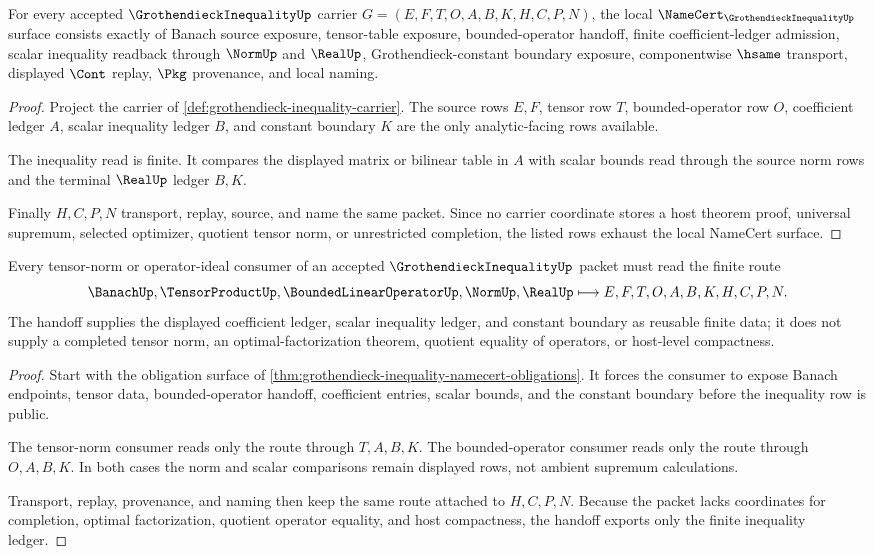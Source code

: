 \begin{theorem}
\label{thm:grothendieck-inequality-namecert-obligations}
For every accepted $\GrothendieckInequalityUp$ carrier $G=(E,F,T,O,A,B,K,H,C,P,N)$, the local $\NameCert_{\GrothendieckInequalityUp}$ surface consists exactly of Banach source exposure, tensor-table exposure, bounded-operator handoff, finite coefficient-ledger admission, scalar inequality readback through $\NormUp$ and $\RealUp$, Grothendieck-constant boundary exposure, componentwise $\hsame$ transport, displayed $\Cont$ replay, $\Pkg$ provenance, and local naming.
\end{theorem}
\begin{proof}
Project the carrier of \autoref{def:grothendieck-inequality-carrier}. The source rows $E,F$, tensor row $T$, bounded-operator row $O$, coefficient ledger $A$, scalar inequality ledger $B$, and constant boundary $K$ are the only analytic-facing rows available.

The inequality read is finite. It compares the displayed matrix or bilinear table in $A$ with scalar bounds read through the source norm rows and the terminal $\RealUp$ ledger $B,K$.

Finally $H,C,P,N$ transport, replay, source, and name the same packet. Since no carrier coordinate stores a host theorem proof, universal supremum, selected optimizer, quotient tensor norm, or unrestricted completion, the listed rows exhaust the local NameCert surface.
\end{proof}

\begin{theorem}
\label{thm:grothendieck-inequality-tensor-norm-handoff}
Every tensor-norm or operator-ideal consumer of an accepted $\GrothendieckInequalityUp$ packet must read the finite route
$$
\BanachUp,\TensorProductUp,\BoundedLinearOperatorUp,\NormUp,\RealUp
\longmapsto
E,F,T,O,A,B,K,H,C,P,N .
$$
The handoff supplies the displayed coefficient ledger, scalar inequality ledger, and constant boundary as reusable finite data; it does not supply a completed tensor norm, an optimal-factorization theorem, quotient equality of operators, or host-level compactness.
\end{theorem}
\begin{proof}
Start with the obligation surface of \autoref{thm:grothendieck-inequality-namecert-obligations}. It forces the consumer to expose Banach endpoints, tensor data, bounded-operator handoff, coefficient entries, scalar bounds, and the constant boundary before the inequality row is public.

The tensor-norm consumer reads only the route through $T,A,B,K$. The bounded-operator consumer reads only the route through $O,A,B,K$. In both cases the norm and scalar comparisons remain displayed rows, not ambient supremum calculations.

Transport, replay, provenance, and naming then keep the same route attached to $H,C,P,N$. Because the packet lacks coordinates for completion, optimal factorization, quotient operator equality, and host compactness, the handoff exports only the finite inequality ledger.
\end{proof}

